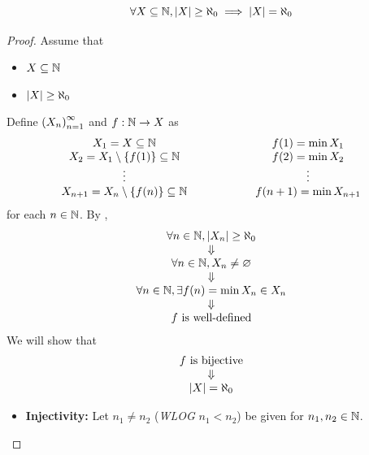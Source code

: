 \bigskip

\begin{lemma} \label{an:lem:infinite-subset-of-N-is-countable}
    \[
    \forall X \subseteq \N, \abs*{X} \geq \aleph_{0} \implies \abs*{X} = \aleph_{0}
    \]
\end{lemma}

\begin{proof}
    Assume that
    \begin{itemize}
        \item $X \subseteq \N$
        \item $\abs*{X} \geq \aleph_{0}$
    \end{itemize}
    Define $\paren*{X_{n}}_{n = 1}^{\infty}$ and $f: \N \to X$ as
    \[
    \begin{array}{c@{\qquad\qquad\qquad}c}
        X_{1} = X \subseteq \N & f(1) = \min X_{1} \\
        X_{2} = X_{1} \setminus \set*{f(1)} \subseteq \N & f(2) = \min X_{2} \\
        \vdots & \vdots \\
        X_{n + 1} = X_{n} \setminus \set*{f(n)} \subseteq \N & f(n + 1) = \min X_{n + 1}
    \end{array}
    \]
    for each $n \in \N$. By ,
    \[
    \begin{array}{c}
        \forall n \in \N, \abs*{X_{n}} \geq \aleph_{0} \\
        \Downarrow \\
        \forall n \in \N, X_{n} \neq \vnot \\
        \Downarrow \\
        \forall n \in \N, \exists f(n) = \min X_{n} \in X_{n} \\
        \Downarrow \\
        f \text{ is well-defined}
    \end{array}
    \]
    We will show that
    \[
    \begin{array}{c}
        f \text{ is bijective} \\
        \Downarrow \\
        \abs*{X} = \aleph_{0}
    \end{array}
    \]
    \begin{itemize}
        \item \textbf{Injectivity:} Let $n_{1} \neq n_{2}$ (\emph{WLOG}
        $n_{1} < n_{2}$) be given for $n_{1}, n_{2} \in \N$.
        \begin{itemize}

\end{itemize}
\end{itemize}
\end{proof}
